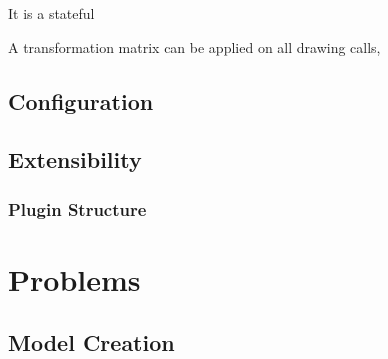 It is a stateful 

A transformation matrix can be applied on all drawing calls,

\subsection{Configuration}



\subsection{Extensibility}
\subsubsection{Plugin Structure}

\section{Problems}
\subsection{Model Creation}
